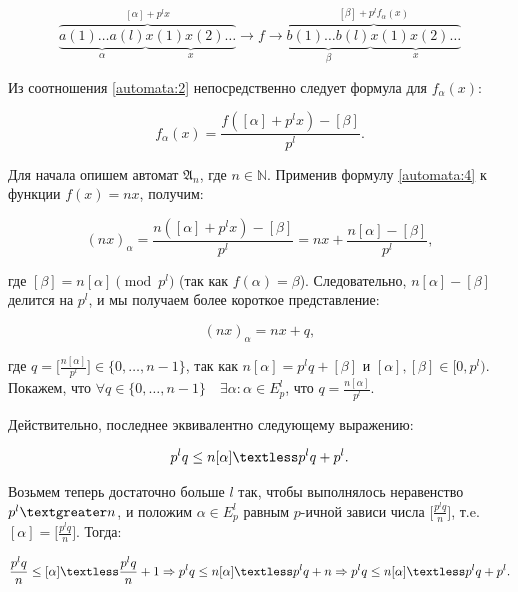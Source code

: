 \documentclass[och, master]{SCWorks}
\theoremstyle{plain}
\theoremstyle{plain}
\theoremstyle{plain}
\theoremstyle{definition}
\begin{document}
\begin{equation} \label{automata:3}
\overbrace{\underbrace{a(1)\ldots a(l)}_{\alpha} \underbrace{x(1)x(2)\ldots}_{x}}^{[\alpha]+p^{l}x} \rightarrow
\boxed{f} \rightarrow \overbrace{\underbrace{b(1)\ldots b(l)}_{\beta} \underbrace{x(1)x(2)\ldots}_{x}}^{[\beta]+p^{l}f_{\alpha}(x)}
\end{equation}


\noindent Из соотношения \ref{automata:2} непосредственно следует формула для $f_{\alpha}(x)$:

\begin{equation} \label{automata:4}
f_{\alpha}(x)=\frac{f([\alpha]+p^{l}x)-[\beta]}{p^l}.
\end{equation}

\noindent Для начала опишем автомат $\mathfrak{A}_n$, где $n \in \mathbb N$. Применив формулу \ref{automata:4} к функции $f(x)=nx$, получим:

\begin{equation} \label{automata:5}
(nx)_{\alpha}=\frac{n([\alpha]+p^{l}x)-[\beta]}{p^l}	=nx+\frac{n[\alpha]-[\beta]}{p^l},
\end{equation}

\noindent где $[\beta]=n[\alpha] \pmod {p^l}$ (так как $f(\alpha)=\beta$). Следовательно, $n[\alpha]-[\beta]$ делится на $p^l$, и мы получаем более короткое представление:

\begin{equation} \label{automata:6}
(nx)_{\alpha}=nx+q,	
\end{equation}

\noindent где $q=\bigg[\frac{n[\alpha]}{p^l}\bigg] \in \{0, \ldots, n-1\}$, так как $n[\alpha]=p^l q+[\beta]$ и $[\alpha],[\beta] \in [0,p^l)$. Покажем, что $\forall q \in \{0, \ldots, n-1\} \quad \exists \alpha: \alpha \in E^l_p$, что  $q=\frac{n[\alpha]}{p^l}$.

\noindent Действительно, последнее эквивалентно следующему выражению:

\begin{equation} \label{automata:7}
p^l q \leq n[\alpha] \textless p^l q+ p^l.	
\end{equation}

\noindent Возьмем теперь достаточно больше $l$ так, чтобы выполнялось неравенство $p^l \textgreater n$, и положим $\alpha \in E^l_p$ равным $p$-ичной зависи числа $\bigg[\frac{p^l q}{n}\bigg]$, т.e. $[\alpha]=\bigg[\frac{p^l q}{n}\bigg]$. Тогда:

\begin{equation} \label{automata:8}
\frac{p^l q}{n} \leq [\alpha] \textless \frac{p^l q}{n} + 1 \Rightarrow p^l q \leq n[\alpha] \textless p^l q +n \Rightarrow p^l q \leq n[\alpha] \textless p^l q + p^l.
\end{equation}
\end{document}
